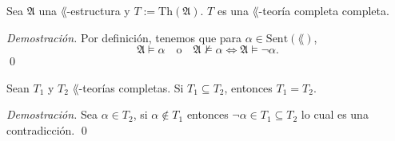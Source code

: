 \begin{proposition}
  Sea $\mathfrak{A}$ una $\lang$-estructura y $T := \mathrm{Th} (\mathfrak{A})$.
  $T$ es una $\lang$-teor\'ia completa completa.
\end{proposition} \hfill \break
\emph{Demostraci\'on.} \hfill \break
Por definici\'on, tenemos que para $\alpha \in \mathrm{Sent} (\lang)$, 
\[ \mathfrak{A} \models \alpha \quad \text{o} \quad \mathfrak{A} \not\models \alpha \iff \mathfrak{A} \models \neg \alpha. \] \qed
\begin{lemma}
  Sean $T_1$ y $T_2$ $\lang$-teor\'ias completas. Si $T_1 \subseteq T_2$, entonces $T_1 = T_2$.
\end{lemma} \hfill \break
\emph{Demostraci\'on.} \hfill \break
Sea $\alpha \in T_2$, si $\alpha \notin T_1$ entonces $\neg \alpha \in T_1 \subseteq T_2$ lo cual es una contradicci\'on. \qed
\newpage
